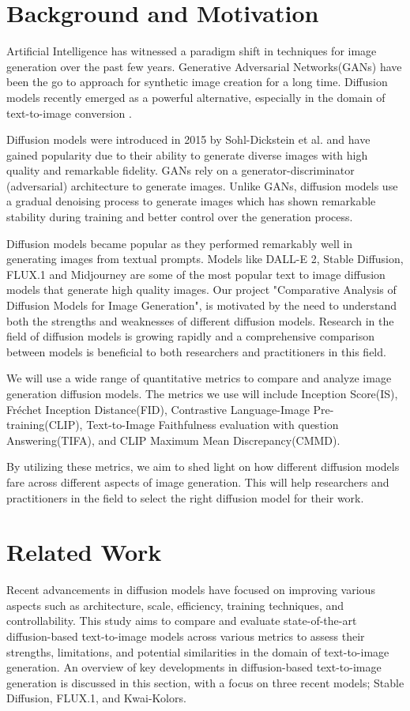 \documentclass{article}
\begin{document}
\section{Background and Motivation}
Artificial Intelligence has witnessed a paradigm shift in techniques for image generation over the past few years. 
Generative Adversarial Networks(GANs) have been the go to approach for synthetic image creation for a long time. 
Diffusion models recently emerged as a powerful alternative, especially in the domain of text-to-image conversion \cite{dhariwal2021}. 

Diffusion models were introduced in 2015 by Sohl-Dickstein et al.\cite{sohl2015} and have gained popularity 
due to their ability to generate diverse images with high quality and remarkable fidelity. GANs rely on a 
generator-discriminator (adversarial) architecture to generate images. Unlike GANs, diffusion models use a 
gradual denoising process to generate images which has shown remarkable stability during training and better control
over the generation process.

Diffusion models became popular as they performed remarkably well in generating images from textual prompts. Models like DALL-E 2,
Stable Diffusion, FLUX.1 and Midjourney are some of the most popular text to image diffusion models that generate high quality images. 
Our project "Comparative Analysis of Diffusion Models for Image Generation", is motivated by the 
need to understand both the strengths and weaknesses of different diffusion models. Research in the field of diffusion models 
is growing rapidly and a comprehensive comparison between models is beneficial to both researchers and practitioners in this field.

We will use a wide range of quantitative metrics to compare and analyze image generation diffusion models. 
The metrics we use will include Inception Score(IS), Fréchet Inception Distance(FID),
Contrastive Language-Image Pre-training(CLIP), Text-to-Image Faithfulness evaluation with question Answering(TIFA), and 
CLIP Maximum Mean Discrepancy(CMMD). 

By utilizing these metrics, we aim to shed light on how different diffusion models fare across different aspects
of image generation. This will help researchers and practitioners in the field to select the right diffusion model for their work. 



\section{Related Work}
Recent advancements in diffusion models have focused on improving various aspects such as 
architecture, scale, efficiency, training techniques, and controllability. This study aims to compare and evaluate state-of-the-art 
diffusion-based text-to-image models across various metrics to assess their strengths, limitations, and potential similarities in the 
domain of text-to-image generation. An overview of key developments in diffusion-based text-to-image generation is discussed in this section, 
with a focus on three recent models; Stable Diffusion, FLUX.1, and Kwai-Kolors.
\end{document}
